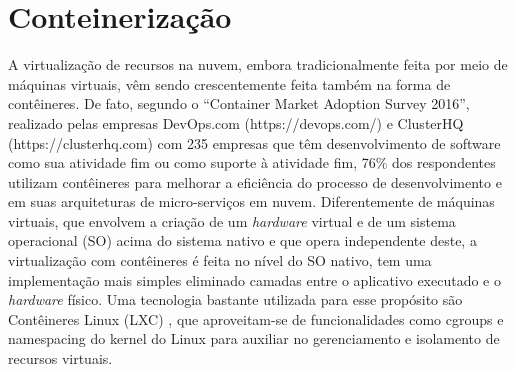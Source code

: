 \section{Conteinerização}
\label{sec:conteiner}

A virtualização de recursos na nuvem, embora tradicionalmente feita por meio de máquinas virtuais, vêm sendo crescentemente feita também na forma de contêineres.
%
De fato, segundo o ``Container Market Adoption Survey 2016'', realizado pelas empresas DevOps.com (https://devops.com/) e ClusterHQ (https://clusterhq.com) com 235 empresas que têm desenvolvimento de software como sua atividade fim ou como suporte à atividade fim, 76\% dos respondentes utilizam contêineres para melhorar a eficiência do processo de desenvolvimento e em suas arquiteturas de micro-serviços em nuvem.
%
Diferentemente de máquinas virtuais, que envolvem a criação de um \textit{hardware} virtual e de um sistema operacional (SO) acima do sistema nativo e que opera independente deste, a virtualização com contêineres é feita no nível do SO nativo, tem uma implementação mais simples eliminado camadas entre o aplicativo executado e o \textit{hardware} físico.
%
Uma tecnologia bastante utilizada para esse propósito são Contêineres Linux (LXC) \cite{Linuxcontainers.org2015}, que aproveitam-se de funcionalidades como cgroups e namespacing do kernel do Linux para auxiliar no gerenciamento e isolamento de recursos virtuais.




